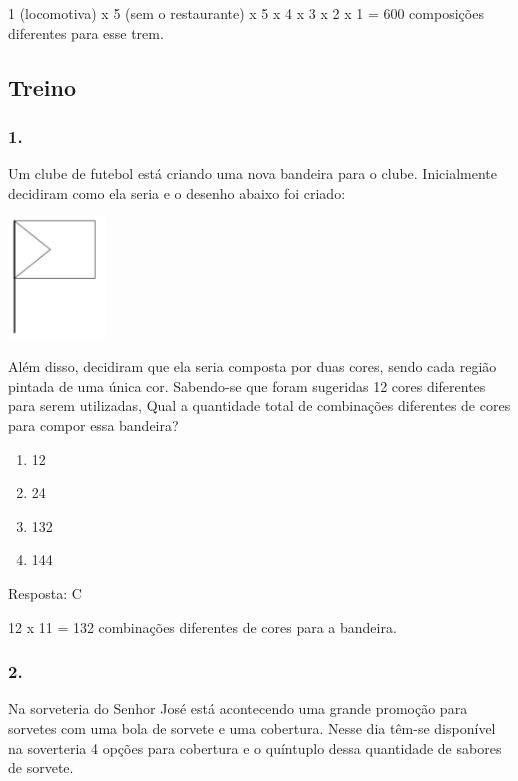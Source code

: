 1 (locomotiva) x 5 (sem o restaurante) x 5 x 4 x 3 x 2 x 1 = 600
composições diferentes para esse trem.

\subsection{Treino}\label{treino-10}

\subsubsection{1.}\label{section-140}

Um clube de futebol está criando uma nova bandeira para o clube.
Inicialmente decidiram como ela seria e o desenho abaixo foi criado:

\includegraphics[width=1.02511in,height=1.26282in]{media/image140.png}

Além disso, decidiram que ela seria composta por duas cores, sendo cada
região pintada de uma única cor. Sabendo-se que foram sugeridas 12 cores
diferentes para serem utilizadas, Qual a quantidade total de combinações
diferentes de cores para compor essa bandeira?

\begin{enumerate}
\def\labelenumi{\alph{enumi})}
\item
  12
\item
  24
\item
  132
\item
  144
\end{enumerate}

Resposta: C

12 x 11 = 132 combinações diferentes de cores para a bandeira.

\subsubsection{2.}\label{section-141}

Na sorveteria do Senhor José está acontecendo uma grande promoção para
sorvetes com uma bola de sorvete e uma cobertura. Nesse dia têm-se
disponível na soverteria 4 opções para cobertura e o quíntuplo dessa
quantidade de sabores de sorvete.

